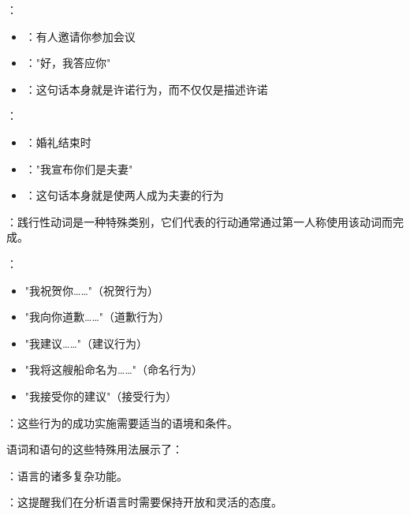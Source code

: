 \begin{examplebox}[title=践行性用法的典型例子]
：
\begin{itemize}
  \item {}：有人邀请你参加会议
  \item {}："好，我答应你"
  \item {}：这句话本身就是许诺行为，而不仅仅是描述许诺
\end{itemize}

：
\begin{itemize}
  \item {}：婚礼结束时
  \item {}："我宣布你们是夫妻"
  \item {}：这句话本身就是使两人成为夫妻的行为
\end{itemize}
\end{examplebox}

\begin{theorembox}[title=践行性动词的特点]
：践行性动词是一种特殊类别，它们代表的行动通常通过第一人称使用该动词而完成。

：
\begin{itemize}
  \item "我祝贺你……"（祝贺行为）
  \item "我向你道歉……"（道歉行为）
  \item "我建议……"（建议行为）
  \item "我将这艘船命名为……"（命名行为）
  \item "我接受你的建议"（接受行为）
\end{itemize}

：这些行为的成功实施需要适当的语境和条件。
\end{theorembox}

\begin{theorembox}[title=自然语言的复杂性]
语词和语句的这些特殊用法展示了：

：语言的诸多复杂功能。

：这提醒我们在分析语言时需要保持开放和灵活的态度。
\end{theorembox}

